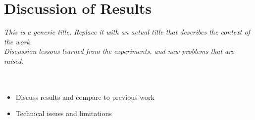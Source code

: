 \chapter{Discussion of Results}
\textit{This is a generic title. Replace it with an actual title that describes the context of the work. \\
Discussion lessons learned from the experiments, and new problems that are raised.}\\
\\
\\
\begin{itemize}
	\item Discuss results and compare to previous work
	\item Technical issues and limitations
\end{itemize}